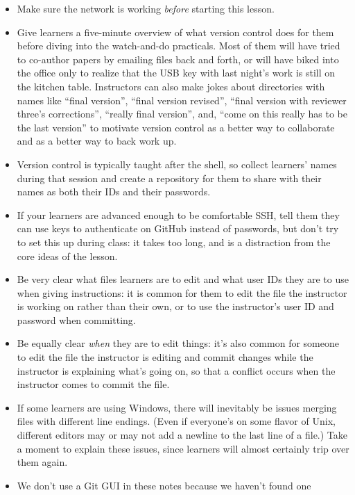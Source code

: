 \documentclass[]{book}
\begin{document}
\begin{itemize}
\item
  Make sure the network is working \emph{before} starting this lesson.
\item
  Give learners a five-minute overview of what version control does for
  them before diving into the watch-and-do practicals. Most of them will
  have tried to co-author papers by emailing files back and forth, or
  will have biked into the office only to realize that the USB key with
  last night's work is still on the kitchen table. Instructors can also
  make jokes about directories with names like ``final version'',
  ``final version revised'', ``final version with reviewer three's
  corrections'', ``really final version'', and, ``come on this really
  has to be the last version'' to motivate version control as a better
  way to collaborate and as a better way to back work up.
\item
  Version control is typically taught after the shell, so collect
  learners' names during that session and create a repository for them
  to share with their names as both their IDs and their passwords.
\item
  If your learners are advanced enough to be comfortable SSH, tell them
  they can use keys to authenticate on GitHub instead of passwords, but
  don't try to set this up during class: it takes too long, and is a
  distraction from the core ideas of the lesson.
\item
  Be very clear what files learners are to edit and what user IDs they
  are to use when giving instructions: it is common for them to edit the
  file the instructor is working on rather than their own, or to use the
  instructor's user ID and password when committing.
\item
  Be equally clear \emph{when} they are to edit things: it's also common
  for someone to edit the file the instructor is editing and commit
  changes while the instructor is explaining what's going on, so that a
  conflict occurs when the instructor comes to commit the file.
\item
  If some learners are using Windows, there will inevitably be issues
  merging files with different line endings. (Even if everyone's on some
  flavor of Unix, different editors may or may not add a newline to the
  last line of a file.) Take a moment to explain these issues, since
  learners will almost certainly trip over them again.
\item
  We don't use a Git GUI in these notes because we haven't found one

\end{itemize}
\end{document}
